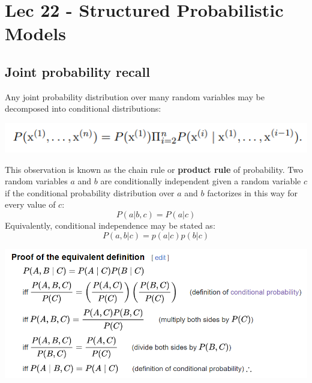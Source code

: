 \chapter{Lec 22 - Structured Probabilistic Models}

\section{Joint probability recall}
Any joint probability distribution over many random variables may be decomposed
into conditional distributions:
\begin{center}
    \includegraphics[]{images/joint-prob.png}
\end{center}
This observation is known as the chain rule or \textbf{product rule} of probability.\newline\newline
Two random variables $a$ and $b$ are conditionally independent given a random
variable $c$ if the conditional probability distribution over $a$ and $b$ factorizes in this way for every value of $c$:
\[P(a | b, c) = P(a | c)\]
Equivalently, conditional independence may be stated as:
\[P(a, b | c) = p(a|c)p(b|c)\]
\begin{center}
    \includegraphics[scale=0.6]{images/proof cond prob.png}
\end{center}


